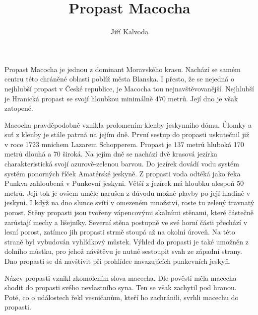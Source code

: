 \documentclass{article}
\author{Jiří Kalvoda}
\date{}
\title{Propast Macocha}
\begin{document}
\maketitle
Propast Macocha je jednou z dominant Moravského krasu.
Nachází se samém centru této chráněné oblasti poblíž města Blanska.
I přesto, že se nejedná o nejhlubší propast v České republice, je Macocha tou nejnavštěvovanější.
Nejhlubší je Hranická propast se svojí hloubkou minimálně 470 metrů.
Její dno je však zatopené.

Macocha pravděpodobně vznikla prolomením klenby jeskynního dómu.
Úlomky a suť z klenby je stále patrná na jejím dně.
První sestup do propasti uskutečnil již v roce 1723 mnichem Lazarem Schopperem.
Propast je 137 metrů hluboká 170 metrů dlouhá a 70 široká.
Na jejím dně se nachází dvě krasová jezírka charakteristická svojí azurově-zelenou barvou.
Do jezírek dovádí vodu systém systém ponorných říček Amatérské jeskyně.
Z propasti voda odtéká jako řeka Punkva zahloubená v Punkevní jeskyni.
Větší z jezírek má hloubku alespoň 50 metrů.
Její tok je ovšem uměle narušen z důvodu možné plavby po její hladině v jeskyni.
I když na dno slunce svítí v omezeném množství, roste tu zelený travnatý porost.
Stěny propasti jsou tvořeny vápencovými skalními stěnami, které částečně zarůstají mechy a lišejníky.
Severní stěna postupně ve své horní části přechází v lesní porost, zatímco jih propasti strmě stoupá až na okolní úroveň.
Na této straně byl vybudován vyhlídkový můstek.
Výhled do propasti je také umožněn z dolního můstku, pro jehož návštěvu je nutné sestoupit svah ze západní strany.
Dno propasti se dá navštívit při prohlídce navazujících punkevních jeskyň.


Název propasti vznikl zkomolením slova macecha. Dle pověsti měla macecha shodit do propasti svého nevlastního syna.
Ten se však zachytil pod hranou. Poté, co o událostech řekl vesničanům, kteří ho zachránili, svrhli macechu do propasti.
\end{document}
